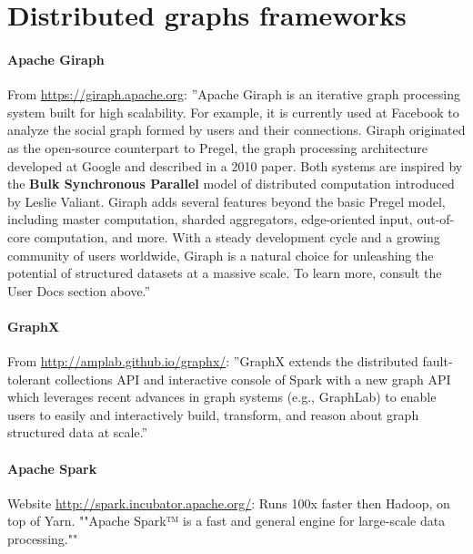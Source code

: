 \documentclass[10pt,a4paper]{article}
\begin{document}
\section{Distributed graphs frameworks}
\paragraph{Apache Giraph} From \url{https://giraph.apache.org}: ''Apache Giraph is an iterative graph processing system built for high scalability. For example, it is currently used at Facebook to analyze the social graph formed by users and their connections. Giraph originated as the open-source counterpart to Pregel, the graph processing architecture developed at Google and described in a 2010 paper. Both systems are inspired by the \textbf{Bulk Synchronous Parallel} model of distributed computation introduced by Leslie Valiant. Giraph adds several features beyond the basic Pregel model, including master computation, sharded aggregators, edge-oriented input, out-of-core computation, and more. With a steady development cycle and a growing community of users worldwide, Giraph is a natural choice for unleashing the potential of structured datasets at a massive scale. To learn more, consult the User Docs section above.''

\paragraph{GraphX} From \url{http://amplab.github.io/graphx/}: ''GraphX extends the distributed fault-tolerant collections API and interactive console of Spark with a new graph API which leverages recent advances in graph systems (e.g., GraphLab) to enable users to easily and interactively build, transform, and reason about graph structured data at scale.''

\paragraph{Apache Spark} Website \url{http://spark.incubator.apache.org/}: Runs 100x faster then Hadoop, on top of Yarn. ""Apache Spark™ is a fast and general engine for large-scale data processing.""
\end{document}

